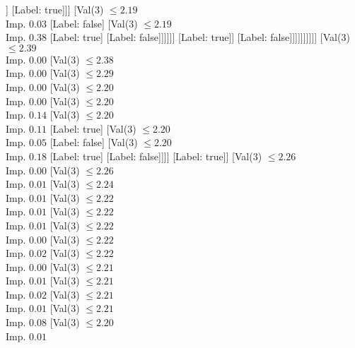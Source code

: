 \documentclass[margin=10pt]{standalone}
\begin{document}
\begin{forest}
																						[Val($3$) $ \leq 2.19$ \\ Imp. $0.50$
																							[Label: true]
																							[Label: false]]
																						[Label: true]]]
																				[Val($3$) $ \leq 2.19$ \\ Imp. $0.03$
																					[Label: false]
																					[Val($3$) $ \leq 2.19$ \\ Imp. $0.38$
																						[Label: true]
																						[Label: false]]]]]]
																	[Label: true]]
																[Label: false]]]]]]]]]]
							[Val($3$) $ \leq 2.39$ \\ Imp. $0.00$
								[Val($3$) $ \leq 2.38$ \\ Imp. $0.00$
									[Val($3$) $ \leq 2.29$ \\ Imp. $0.00$
										[Val($3$) $ \leq 2.20$ \\ Imp. $0.00$
											[Val($3$) $ \leq 2.20$ \\ Imp. $0.14$
												[Val($3$) $ \leq 2.20$ \\ Imp. $0.11$
													[Label: true]
													[Val($3$) $ \leq 2.20$ \\ Imp. $0.05$
														[Label: false]
														[Val($3$) $ \leq 2.20$ \\ Imp. $0.18$
															[Label: true]
															[Label: false]]]]
												[Label: true]]
											[Val($3$) $ \leq 2.26$ \\ Imp. $0.00$
												[Val($3$) $ \leq 2.26$ \\ Imp. $0.01$
													[Val($3$) $ \leq 2.24$ \\ Imp. $0.01$
														[Val($3$) $ \leq 2.22$ \\ Imp. $0.01$
															[Val($3$) $ \leq 2.22$ \\ Imp. $0.01$
																[Val($3$) $ \leq 2.22$ \\ Imp. $0.00$
																	[Val($3$) $ \leq 2.22$ \\ Imp. $0.02$
																		[Val($3$) $ \leq 2.22$ \\ Imp. $0.00$
																			[Val($3$) $ \leq 2.21$ \\ Imp. $0.01$
																				[Val($3$) $ \leq 2.21$ \\ Imp. $0.02$
																					[Val($3$) $ \leq 2.21$ \\ Imp. $0.01$
																						[Val($3$) $ \leq 2.21$ \\ Imp. $0.08$
																							[Val($3$) $ \leq 2.20$ \\ Imp. $0.01$

\end{forest}
\end{document}
